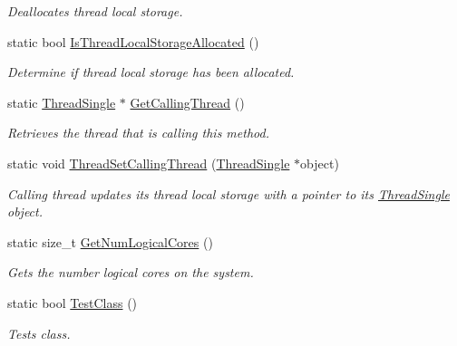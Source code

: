 \begin{DoxyCompactItemize}
\begin{DoxyCompactList}\small\item\em Deallocates thread local storage. \item\end{DoxyCompactList}\item 
static bool \hyperlink{class_thread_single_aa9aff537d89b1baf37f212c8d5625092}{IsThreadLocalStorageAllocated} ()
\begin{DoxyCompactList}\small\item\em Determine if thread local storage has been allocated. \item\end{DoxyCompactList}\item 
static \hyperlink{class_thread_single}{ThreadSingle} $\ast$ \hyperlink{class_thread_single_aa453d445ef270a5e86e858f02dba1845}{GetCallingThread} ()
\begin{DoxyCompactList}\small\item\em Retrieves the thread that is calling this method. \item\end{DoxyCompactList}\item 
static void \hyperlink{class_thread_single_a2eb55a419326e7c7d8236cf3299d2030}{ThreadSetCallingThread} (\hyperlink{class_thread_single}{ThreadSingle} $\ast$object)
\begin{DoxyCompactList}\small\item\em Calling thread updates its thread local storage with a pointer to its \hyperlink{class_thread_single}{ThreadSingle} object. \item\end{DoxyCompactList}\item 
static size\_\-t \hyperlink{class_thread_single_a8a775cd9c2ced572c907859858240e03}{GetNumLogicalCores} ()
\begin{DoxyCompactList}\small\item\em Gets the number logical cores on the system. \item\end{DoxyCompactList}\item 
static bool \hyperlink{class_thread_single_ad62d9d1a31db4a8a77848a8c6dab4815}{TestClass} ()
\begin{DoxyCompactList}\small\item\em Tests class. \item\end{DoxyCompactList}\end{DoxyCompactItemize}

